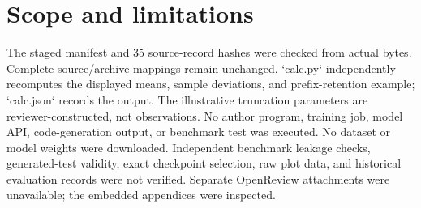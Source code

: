 \documentclass[10pt]{article}
\begin{document}
\section*{Scope and limitations}
The staged manifest and 35 source-record hashes were checked from actual bytes. Complete source/archive mappings remain unchanged. `calc.py` independently recomputes the displayed means, sample deviations, and prefix-retention example; `calc.json` records the output. The illustrative truncation parameters are reviewer-constructed, not observations. No author program, training job, model API, code-generation output, or benchmark test was executed. No dataset or model weights were downloaded. Independent benchmark leakage checks, generated-test validity, exact checkpoint selection, raw plot data, and historical evaluation records were not verified. Separate OpenReview attachments were unavailable; the embedded appendices were inspected.\par
\end{document}

